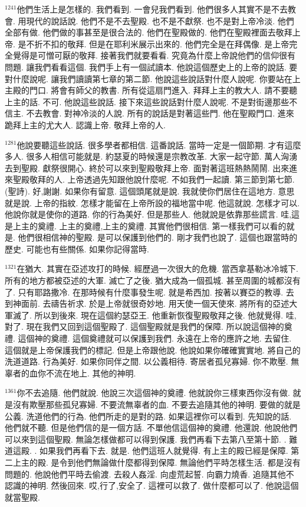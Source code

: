 \documentclass{book}
\begin{document}
$^{1241}$他們生活上是怎樣的.
我們看到.
一會兒我們看到.
他們很多人其實不是不去教會.
用現代的說話說.
他們不是不去聖殿.
也不是不獻祭.
也不是對上帝冷淡.
他們全部有做.
他們做的事甚至是很合法的.
他們在聖殿做的.
他們在聖殿裡面去敬拜上帝.
是不折不扣的敬拜.
但是在耶利米展示出來的.
他們完全是在拜偶像.
是上帝完全覺得是可憎可厭的敬拜.
接著我們就要看看.
究竟為什麼上帝說他們的信仰很有問題.
讓我們看看這個.
我們手上有一個試讀本.
他說這個歷史上的上帝的說話.
要對什麼說呢.
讓我們讀讀第七章的第二節.
他說這些說話對什麼人說呢.
你要站在上主殿的門口.
將會有師父的教書.
所有從這扇門進入.
拜拜上主的教大人.
請不要聽上主的話.
不可.
他說這些說話.
接下來這些說話對什麼人說呢.
不是對街邊那些不信主.
不去教會.
對神冷淡的人說.
所有的說話是對著這些門.
他在聖殿門口.
進來跪拜上主的尤大人.
認識上帝.
敬拜上帝的人.

$^{1281}$他說要聽這些說話.
很多學者都相信.
這番說話.
當時一定是一個節期.
才有這麼多人.
很多人相信可能就是.
約瑟夏的時候還是宗教改革.
大家一起守節.
萬人洶湧去到聖殿.
獻祭很開心.
終於可以來到聖殿敬拜上帝.
面對著這班熱熱鬧鬧.
出來進來聖殿敬拜的人.
上帝透過先知跟他說什麼呢.
不如我們一起讀.
第三節到第七節.
(聖詩).
好,謝謝.
如果你有留意.
這個頭尾就是說.
我就使你們居住在這地方.
意思就是說.
上帝的指紋.
怎樣才能留在上帝所設的福地當中呢.
他這就說.
怎樣才可以.
他說你就是使你的道路.
你的行為美好.
但是那些人.
他就說是依靠那些謊言.
哇,這是上主的奠禮.
上主的奠禮,上主的奠禮.
其實他們很相信.
第一樣我們可以看的就是.
他們很相信神的聖殿.
是可以保護到他們的.
剛才我們也說了.
這個也跟當時的歷史.
可能也有些關係.
如果你記得當時.

$^{1321}$在猶大.
其實在亞述攻打的時候.
經歷過一次很大的危機.
當西拿基勒冰冷城下.
所有的地方都被亞述的大軍.
滅亡了之後.
猶大成為一個孤城.
甚至周圍的城都沒有了.
只有耶路撒冷.
在那時候有什麼事發生呢.
就是希西加.
按著以賽亞的教導.
去到神面前.
去禱告祈求.
於是上帝就很奇妙地.
用天使一個天使來.
將所有的亞述大軍滅了.
所以到後來.
現在這個約瑟亞王.
他重新恢復聖殿敬拜之後.
他就覺得.
哇,對了.
現在我們又回到這個聖殿了.
這個聖殿就是我們的保障.
所以說這個神的奠禮.
這個神的奠禮.
這個奠禮就可以保護到我們.
永遠在上帝的應許之地.
去留住.
這個就是上帝保護我們的標記.
但是上帝跟他說.
他說如果你確確實實地.
將自己的洗道道路.
行為美好.
如果你同伴之間.
以公義相待.
寄居者孤兒寡婦.
你不欺壓.
無辜者的血你不流在地上.
其他的神明.

$^{1361}$你不去追隨.
他們就說.
他說三次這個神的奠禮.
他就說你三樣東西你沒有做.
就是沒有欺壓那些孤兒寡婦.
不要流無辜者的血.
不要去追隨其他的神明.
要做的就是公義.
洗道他們的行為.
他們所走的是對的路.
如果這裡你可以看到.
先知說的話.
他們就不聽.
但是他們信的是一個方話.
不單他信這個神的奠禮.
他還說.
他說他們可以來到這個聖殿.
無論怎樣做都可以得到保護.
我們再看下去第八至第十節.
.
難道這殿.
.
如果我們再看下去.
就是.
他們這班人就覺得.
有上主的殿已經是保障.
第二上主的殿.
是令到他們無論做什麼都得到保障.
無論他們平時怎樣生活.
都是沒有問題的.
他說他們平時去偷渡.
去殺人姦淫.
向虛荒起誓.
向霸力燒香.
追隨其他不認識的神明.
然後回來.
哎,行了,安全了.
這裡可以救了.
做什麼都可以了.
他說這個就當聖殿.
\end{document}
